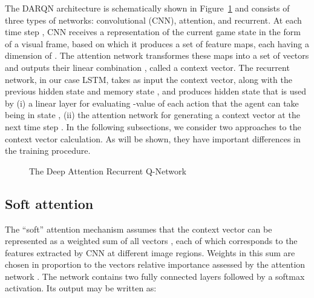 \documentclass{article} \usepackage{nips15submit_e,times}
\begin{document}
The DARQN architecture is schematically shown in Figure~\ref{fig:model} and consists of three types of networks:
convolutional (CNN), attention, and recurrent. At each time step , CNN receives a representation
of the current game state  in the form of a visual frame, based on which it produces a set of  feature maps, each having a dimension of . The attention network transformes these maps into a set of vectors  and outputs
their linear combination , called a context vector. The recurrent network, in our case LSTM,
takes as input the context vector, along with the previous hidden state  and memory state , and produces hidden state  that is used by (i) a linear layer for evaluating -value of each action  that the agent can take being in state , (ii) the attention network for generating a context vector at the next time step .
In the following subsections, we consider two approaches to the context vector calculation. As will be shown, they have important differences in the training procedure. \par

\begin{figure}
\centering
{}
\caption{The Deep Attention Recurrent Q-Network}
\label{fig:model}
\end{figure}

\subsection{Soft attention}

The ``soft'' attention mechanism assumes that the context vector  can be represented as a weighted sum of all vectors , 
each of which corresponds to the features extracted by CNN at different image regions. Weights in this sum are chosen in proportion to the vectors relative importance assessed by the attention network . The  network contains two fully connected layers followed by a softmax activation. 
Its output may be written as:
\end{document}
